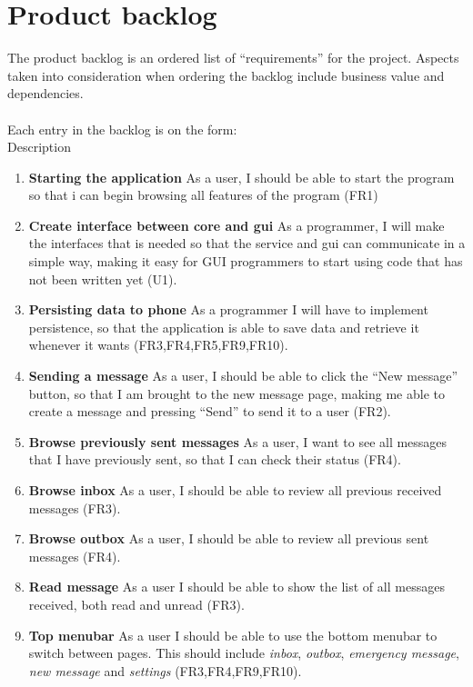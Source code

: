 \chapter{Product backlog}
The product backlog is an ordered list of ``requirements'' for the project. Aspects taken into consideration when ordering the backlog include business value and dependencies.\\\\
		Each entry in the backlog is on the form:\\
			 {Description}
		
		\begin{enumerate}
			\item {\bf Starting the application} As a user, I should be able to start the program so that i can begin browsing all features of the program (FR1)
			\item {\bf Create interface between core and gui} As a programmer, I will make the interfaces that is needed so that the service and gui can communicate in a simple way, making it easy for GUI programmers to start using code that has not been written yet (U1).
			\item {\bf Persisting data to phone} As a programmer I will have to implement persistence, so that the application is able to save data and retrieve it whenever it wants (FR3,FR4,FR5,FR9,FR10).
			\item {\bf Sending a message} As a user, I should be able to click the ``New message'' button, so that I am brought to the new message page, making me able to create a message and pressing ``Send'' to send it to a user (FR2).
			\item {\bf Browse previously sent messages} As a user, I want to see all messages that I have previously sent, so that I can check their status (FR4). 
			\item {\bf Browse inbox} As a user, I should be able to review all previous received messages (FR3).
			\item {\bf Browse outbox} As a user, I should be able to review all previous sent messages (FR4).
			\item {\bf{Read message}} As a user I should be able to show the list of all messages received, both read and unread (FR3).
			\item {\bf Top menubar} As a user I should be able to use the bottom menubar to switch between pages. This should include {\it inbox}, {\it outbox}, {\it emergency message}, {\it new message} and {\it settings} (FR3,FR4,FR9,FR10).

\end{enumerate}
